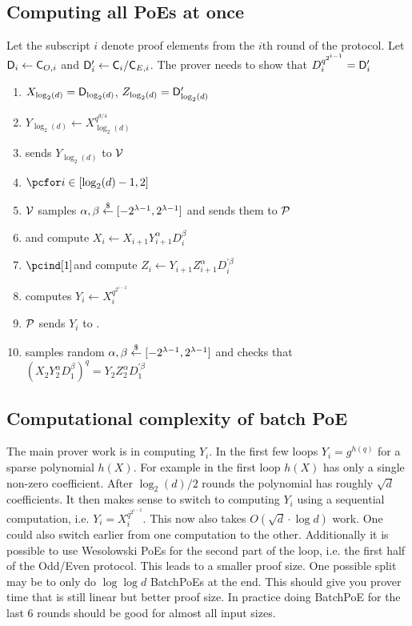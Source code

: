 \documentclass[12pt]{article}
\begin{document}
\subsection{Computing all PoEs at once}
Let the subscript $i$ denote proof elements from the $i$th round of the protocol.
Let $\mathsf{D}_i\gets \mathsf{C}_{O,i}$ and $\mathsf{D}_i'\gets \mathsf{C}_i/\mathsf{C}_{E,i}$. The prover needs to show that $D_i^{q^{2^{i-1}}}=\mathsf{D}'_i$
\begin{enumerate}[nolistsep]
\item $X_{\log_2(d)}=\mathsf{D}_{\log_2(d)}$, $Z_{\log_2(d)}=\mathsf{D}'_{\log_2(d)}$
\item $Y_{\log_2(d)}\gets X_{\log_2(d)}^{q^{d/4}}$ 
\item \prover sends $Y_{\log_2(d)}$ to $\mathcal{V}$
	\item $\pcfor i \in [\log_2(d)-1,2]$
	\item \pcind[1]$\mathcal{V}$ samples $\alpha,\beta \overset{\$}{\gets} [-2^{\lambda-1} ,2^{\lambda-1}]$ and sends them to $\mathcal{P}$
	\item \pcind[1]\prover and \verifier compute  $X_{i}\gets  X_{i+1} Y_{i+1}^{\alpha}D_{i}^{\beta}$
	\item $\pcind[1]$\prover and \verifier compute   $Z_{i}\gets Y_{i+1}Z_{i+1}^{\alpha}D_{i}^{'\beta}$
		\item \pcind[1]\prover computes $Y_{i}\gets X_{i}^{q^{2^{i-2}}}$ 
		\item \pcind[1]$\mathcal{P}$ sends $Y_{i}$ to \verifier.
\item \verifier samples random $\alpha,\beta \overset{\$}{\gets} [-2^{\lambda-1} ,2^{\lambda-1}]$ and checks that $(X_{2} Y_{2}^{\alpha}D_{1}^{\beta})^q=Y_{2}Z_{2}^{\alpha}D_{1}^{'\beta}$
\end{enumerate}
\subsection{Computational complexity of batch PoE}
The main prover work is in computing $Y_i$. In the first few loops $Y_i=g^{h(q)}$ for a sparse polynomial $h(X)$. For example in the first loop $h(X)$ has only a single non-zero coefficient.
After $\log_2(d)/2$ rounds the polynomial has roughly $\sqrt{d}$ coefficients. It then makes sense to switch to computing $Y_i$ using a sequential computation, i.e. $Y_i=X_i^{q^{2^{i-2}}}$. This now also takes $O(\sqrt{d}\cdot \log{d})$ work. One could also switch earlier from one computation to the other. Additionally it is possible to use Wesolowski PoEs for the second part of the loop, i.e. the first half of the Odd/Even protocol. This leads to a smaller proof size. One possible split may be to only do $\log{\log{d}}$ BatchPoEs at the end. This should give you prover time that is still linear but better proof size. In practice doing BatchPoE for the last $6$ rounds should be good for almost all input sizes.
\end{document}

